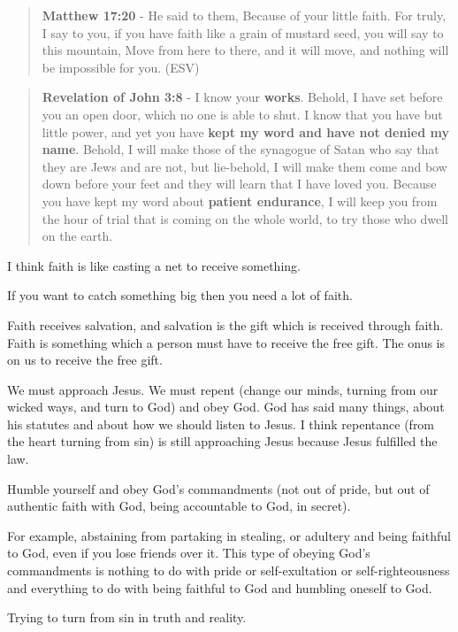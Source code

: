 \documentclass[11pt]{article}
\begin{document}
\begin{quote}
\textbf{Matthew 17:20} - He said to them, Because of your little faith. For truly, I say to you, if you have faith like a grain of mustard seed, you will say to this mountain, Move from here to there, and it will move, and nothing will be impossible for you. (ESV)
\end{quote}

\begin{quote}
\textbf{Revelation of John 3:8} - I know your \textbf{works}. Behold, I have set before you an open door, which no one is able to shut. I know that you have but little power, and yet you have \textbf{kept my word and have not denied my name}. Behold, I will make those of the synagogue of Satan who say that they are Jews and are not, but lie-behold, I will make them come and bow down before your feet and they will learn that I have loved you. Because you have kept my word about \textbf{patient endurance}, I will keep you from the hour of trial that is coming on the whole world, to try those who dwell on the earth.
\end{quote}

I think faith is like casting a net to receive something.

If you want to catch something big then you need a lot of faith.

Faith receives salvation, and salvation is the gift which is received through faith.
Faith is something which a person must have to receive the free gift.
The onus is on us to receive the free gift.

We must approach Jesus.
We must repent (change our minds, turning from our wicked ways, and turn to God) and obey God.
God has said many things, about his statutes and about how we should listen to Jesus.
I think repentance (from the heart turning from sin) is still approaching Jesus because Jesus fulfilled the law.

Humble yourself and obey God's commandments (not out of pride, but out of authentic faith with God, being accountable to God, in secret).

For example, abstaining from partaking in stealing, or adultery and being faithful to God, even if you lose friends over it.
This type of obeying God's commandments is nothing to do with pride or self-exultation or self-righteousness and everything to do with being faithful to God and humbling oneself to God.

Trying to turn from sin in truth and reality.
\end{document}
